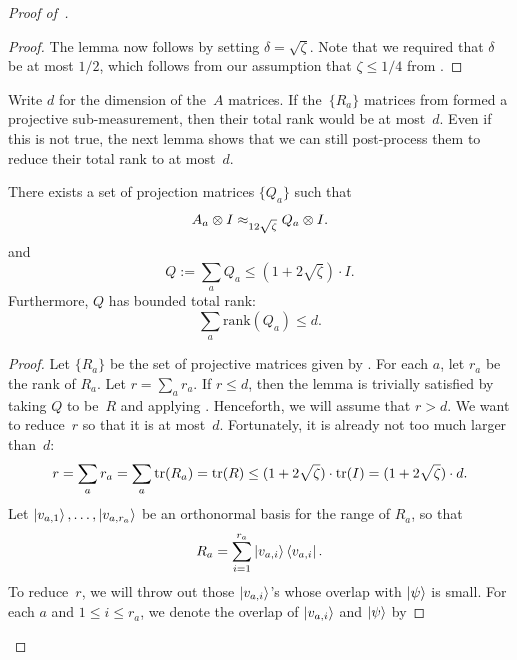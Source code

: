 \begin{proof}[Proof of~]
\begin{proof}
The lemma now follows by setting $\delta = \sqrt{\zeta}$. Note that we required that $\delta$ be at most $1/2$,
which follows from our assumption that $\zeta \leq 1/4$ from .

\end{proof}

Write $d$ for the dimension of the~$A$ matrices.
If the~$\{R_a\}$ matrices from  formed a projective sub-measurement,
then their total rank would be at most~$d$.
Even if this is not true,
the next lemma shows that we can still post-process them
to reduce their total rank to at most~$d$.

\begin{lemma}\label{lem:projective-low-rank-sum}
There exists a set of projection matrices $\{Q_a\}$ such that
\begin{equation*}
A_a \otimes I \approx_{12\sqrt{\zeta}} Q_a \otimes I.
\end{equation*}
and
\begin{equation*}
Q:= \sum_a Q_a \leq (1+2\sqrt{\zeta}) \cdot I.
\end{equation*}
Furthermore,  $Q$ has bounded total rank:
\begin{equation*}
\sum_a \mathrm{rank}(Q_a) \leq d.
\end{equation*}
\end{lemma}
\begin{proof}
Let $\{R_a\}$ be the set of projective matrices given by .
For each $a$, let $r_a$ be the rank of $R_a$.
Let $r = \sum_a r_a$.
If $r \leq d$, then the lemma is trivially satisfied by taking $Q$ to be~$R$ and applying .
Henceforth, we will assume that $r > d$.
We want to reduce~$r$ so that it is at most~$d$.
Fortunately, it is already not too much larger than~$d$:
\begin{equation}\label{eq:bound-on-r}
r
= \sum_{a} r_a
= \sum_{a} \mathrm{tr}(R_a)
= \mathrm{tr}(R)
\leq (1 + 2\sqrt{\zeta}) \cdot \mathrm{tr}(I)
= (1+2\sqrt{\zeta}) \cdot d.
\end{equation}
Let $\ket{v_{a, 1}}, \ldots, \ket{v_{a, r_a}}$ be an orthonormal basis for the range of $R_a$, so that
\begin{equation*}
R_a = \sum_{i=1}^{r_a} \ket{v_{a, i}}\bra{v_{a,i}}.
\end{equation*}
To reduce~$r$,
we will throw out those $\ket{v_{a,i}}$'s whose overlap with $\ket{\psi}$ is small.
For each $a$ and $1 \leq i \leq r_a$, we denote the overlap of $\ket{v_{a,i}}$ and $\ket{\psi}$ by

\end{proof}
\end{proof}

